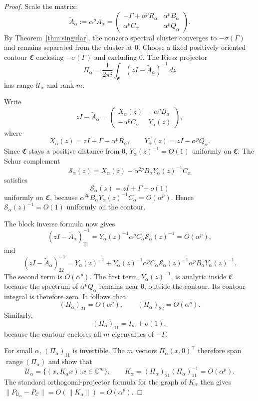 \documentclass[10pt,a4paper]{amsart}
\begin{document}
\begin{proof}
Scale the matrix:
\[
 \widetilde A_\alpha:=\alpha^pA_\alpha
 =
 \begin{pmatrix}
     -\Gamma+\alpha^pR_\alpha & \alpha^pB_\alpha\\
     \alpha^pC_\alpha & \alpha^pQ_\alpha
 \end{pmatrix}.
\]
By Theorem~\ref{thm:singular}, the nonzero spectral cluster converges to
$-\sigma(\Gamma)$ and remains separated from the cluster at $0$.  Choose a
fixed positively oriented contour $\mathfrak C$ enclosing
$-\sigma(\Gamma)$ and excluding $0$.  The Riesz projector
\[
    \Pi_\alpha
    =
    \frac{1}{2\pi i}
    \int_{\mathfrak C}
    (zI-\widetilde A_\alpha)^{-1}\,dz
\]
has range $\mathcal U_\alpha$ and rank $m$.

Write
\[
 zI-\widetilde A_\alpha
 =
 \begin{pmatrix}
 X_\alpha(z) & -\alpha^pB_\alpha\\
 -\alpha^pC_\alpha & Y_\alpha(z)
 \end{pmatrix},
\]
where
\[
 X_\alpha(z)=zI+\Gamma-\alpha^pR_\alpha,
 \qquad
 Y_\alpha(z)=zI-\alpha^pQ_\alpha.
\]
Since $\mathfrak C$ stays a positive distance from $0$,
$Y_\alpha(z)^{-1}=O(1)$ uniformly on $\mathfrak C$.  The Schur complement
\[
 \mathcal S_\alpha(z)
 =
 X_\alpha(z)
 -
 \alpha^{2p}B_\alpha Y_\alpha(z)^{-1}C_\alpha
\]
satisfies
\[
 \mathcal S_\alpha(z)
 =
 zI+\Gamma+o(1)
\]
uniformly on $\mathfrak C$, because
$\alpha^{2p}B_\alpha Y_\alpha(z)^{-1}C_\alpha=O(\alpha^p)$.
Hence $\mathcal S_\alpha(z)^{-1}=O(1)$ uniformly on the contour.

The block inverse formula now gives
\[
 (zI-\widetilde A_\alpha)^{-1}_{21}
 =
 Y_\alpha(z)^{-1}\alpha^pC_\alpha\mathcal S_\alpha(z)^{-1}
 =
 O(\alpha^p),
\]
and
\[
 (zI-\widetilde A_\alpha)^{-1}_{22}
 =
 Y_\alpha(z)^{-1}
 +
 Y_\alpha(z)^{-1}\alpha^pC_\alpha\mathcal S_\alpha(z)^{-1}
 \alpha^pB_\alpha Y_\alpha(z)^{-1}.
\]
The second term is $O(\alpha^p)$.  The first term,
$Y_\alpha(z)^{-1}$, is analytic inside $\mathfrak C$ because the spectrum of
$\alpha^pQ_\alpha$ remains near $0$, outside the contour.  Its contour
integral is therefore zero.  It follows that
\[
    (\Pi_\alpha)_{21}=O(\alpha^p),
    \qquad
    (\Pi_\alpha)_{22}=O(\alpha^p).
\]
Similarly,
\[
    (\Pi_\alpha)_{11}=I_m+o(1),
\]
because the contour encloses all $m$ eigenvalues of $-\Gamma$.

For small $\alpha$, $(\Pi_\alpha)_{11}$ is invertible.  The $m$ vectors
$\Pi_\alpha(x,0)^\top$ therefore span $\operatorname{range}(\Pi_\alpha)$ and
show that
\[
    \mathcal U_\alpha
    =
    \{(x,K_\alpha x):x\in\mathbb C^m\},
    \qquad
    K_\alpha
    =
    (\Pi_\alpha)_{21}(\Pi_\alpha)_{11}^{-1}
    =
    O(\alpha^p).
\]
The standard orthogonal-projector formula for the graph of $K_\alpha$ then
gives
$\|P_{\mathcal U_\alpha}-P_{\mathcal C}\|=O(\|K_\alpha\|)=O(\alpha^p)$.
\end{proof}
\end{document}
